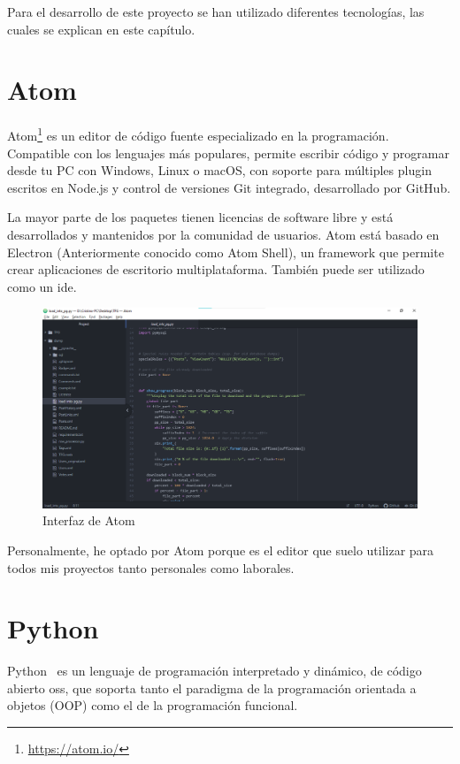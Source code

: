 \documentclass[a4paper, 12pt]{book}
\begin{document}
Para el desarrollo de este proyecto se han utilizado diferentes tecnologías, las cuales se explican en este capítulo.

\section{Atom} 
\label{sec:atom}
Atom\footnote{\url{https://atom.io/}} es un editor de código fuente especializado en la programación. Compatible con los lenguajes más populares, permite escribir código y programar desde tu PC con Windows, Linux o macOS, con soporte para múltiples \gls{plugin} escritos en Node.js y control de versiones Git integrado, desarrollado por GitHub. 

La mayor parte de los paquetes tienen licencias de software libre y está desarrollados y mantenidos por la comunidad de usuarios. Atom está basado en Electron (Anteriormente conocido como Atom Shell), un framework que permite crear aplicaciones de escritorio multiplataforma. También puede ser utilizado como un \gls{ide}.

\begin{figure}[ht]
        \centering
        \includegraphics[width=\textwidth]{img/ATOM.png}
        \caption{Interfaz de Atom}
        \label{figura:ATOM}
    \end{figure}

Personalmente, he optado por Atom porque es el editor que suelo utilizar para todos
mis proyectos tanto personales como laborales. 

\section{Python} 
\label{sec:Python}

Python~\cite{van2007python} es un lenguaje de programación interpretado y dinámico, de código abierto \gls{oss}, que
soporta tanto el paradigma de la programación orientada a objetos (OOP) como el de la programación funcional.
\end{document}
